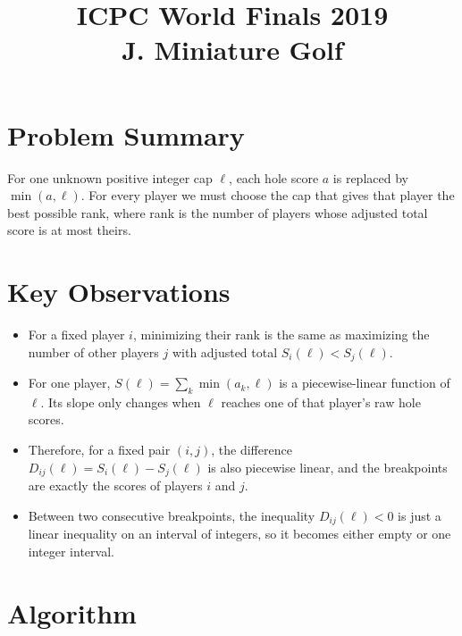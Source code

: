 \documentclass[11pt]{article}
\title{ICPC World Finals 2019\\J. Miniature Golf}
\author{}
\date{}
\begin{document}
\maketitle

\section*{Problem Summary}

For one unknown positive integer cap $\ell$, each hole score $a$ is replaced by $\min(a,\ell)$.
For every player we must choose the cap that gives that player the best possible rank, where rank is
the number of players whose adjusted total score is at most theirs.

\section*{Key Observations}

\begin{itemize}[leftmargin=*]
    \item For a fixed player $i$, minimizing their rank is the same as maximizing the number of other
    players $j$ with adjusted total $S_i(\ell) < S_j(\ell)$.
    \item For one player, $S(\ell)=\sum_k \min(a_k,\ell)$ is a piecewise-linear function of $\ell$.
    Its slope only changes when $\ell$ reaches one of that player's raw hole scores.
    \item Therefore, for a fixed pair $(i,j)$, the difference
    $D_{ij}(\ell)=S_i(\ell)-S_j(\ell)$ is also piecewise linear, and the breakpoints are exactly the
    scores of players $i$ and $j$.
    \item Between two consecutive breakpoints, the inequality $D_{ij}(\ell)<0$ is just a linear
    inequality on an interval of integers, so it becomes either empty or one integer interval.
\end{itemize}

\section*{Algorithm}
\end{document}
